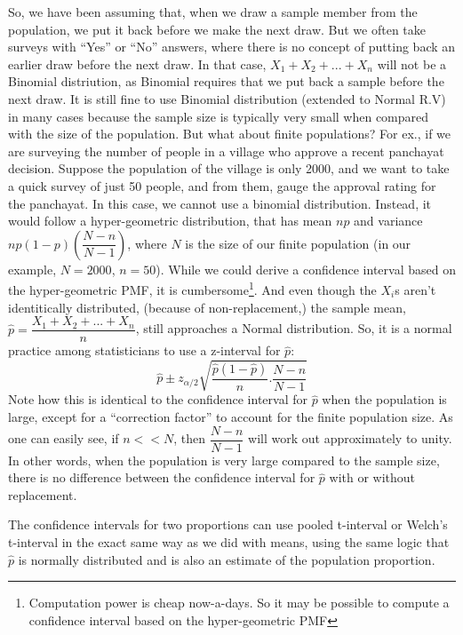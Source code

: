 So, we have been assuming that, when we draw a sample member from the population, we put it back before we make the next draw. But we often take surveys with ``Yes'' or ``No'' answers, where there is no concept of putting back an earlier draw before the next draw. In that case, \( X_1+X_2+...+X_n \) will not be a Binomial distriution, as Binomial requires that we put back a sample before the next draw. It is still fine to use Binomial distribution (extended to Normal R.V) in many cases because the sample size is typically very small when compared with the size of the population. But what about finite populations? For ex., if we are surveying the number of people in a village who approve a recent panchayat decision. Suppose the population of the village is only 2000, and we want to take a quick survey of just 50 people, and from them, gauge the approval rating for the panchayat. In this case, we cannot use a binomial distribution. Instead, it would follow a hyper-geometric distribution, that has mean $np$ and variance \( np(1-p) \left(\dfrac{N - n}{N - 1}\right) \), where $N$ is the size of our finite population (in our example, $N = 2000$, $n = 50$). While we could derive a confidence interval based on the hyper-geometric PMF, it is cumbersome\footnote{Computation power is cheap now-a-days. So it may be possible to compute a confidence interval based on the hyper-geometric PMF}. And even though the $X_i$s aren't identitically distributed, (because of non-replacement,) the sample mean, \( \hat{p} = \dfrac{X_1+X_2+...+X_n}{n} \), still approaches a Normal distribution. So, it is a normal practice among statisticians to use a z-interval for $\hat{p}$:
	\[ \hat{p}\pm z_{\alpha/2}\sqrt{\dfrac{\hat{p}(1-\hat{p})}{n} . \dfrac{N-n}{N-1}} \]
Note how this is identical to the confidence interval for $\hat{p}$ when the population is large, except for a ``correction factor'' to account for the finite population size. As one can easily see, if $n<<N$, then \( \dfrac{N - n}{N - 1} \) will work out approximately to unity. In other words, when the population is very large compared to the sample size, there is no difference between the confidence interval for $\hat{p}$ with or without replacement.

The confidence intervals for two proportions can use pooled t-interval or Welch's t-interval in the exact same way as we did with means, using the same logic that $\hat{p}$ is normally distributed and is also an estimate of the population proportion. 

